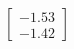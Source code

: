 \documentclass[preview]{standalone}
\begin{document}
\begin{align*}
\begin{bmatrix} -1.53 \\ -1.42 \end{bmatrix}
\end{align*}
\end{document}
